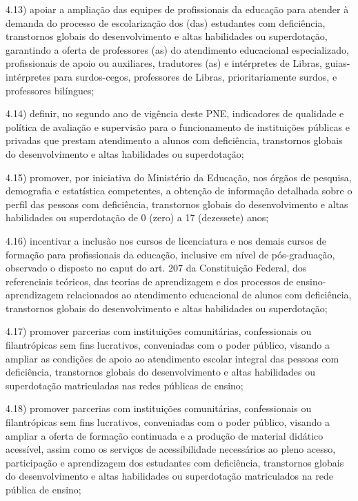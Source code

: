 \documentclass[
]{book}
\begin{document}
4.13) apoiar a ampliação das equipes de profissionais da educação para atender à demanda do processo de escolarização dos (das) estudantes com deficiência, transtornos globais do desenvolvimento e altas habilidades ou superdotação, garantindo a oferta de professores (as) do atendimento educacional especializado, profissionais de apoio ou auxiliares, tradutores (as) e intérpretes de Libras, guias-intérpretes para surdos-cegos, professores de Libras, prioritariamente surdos, e professores bilíngues;

4.14) definir, no segundo ano de vigência deste PNE, indicadores de qualidade e política de avaliação e supervisão para o funcionamento de instituições públicas e privadas que prestam atendimento a alunos com deficiência, transtornos globais do desenvolvimento e altas habilidades ou superdotação;

4.15) promover, por iniciativa do Ministério da Educação, nos órgãos de pesquisa, demografia e estatística competentes, a obtenção de informação detalhada sobre o perfil das pessoas com deficiência, transtornos globais do desenvolvimento e altas habilidades ou superdotação de 0 (zero) a 17 (dezessete) anos;

4.16) incentivar a inclusão nos cursos de licenciatura e nos demais cursos de formação para profissionais da educação, inclusive em nível de pós-graduação, observado o disposto no caput do art. 207 da Constituição Federal, dos referenciais teóricos, das teorias de aprendizagem e dos processos de ensino-aprendizagem relacionados ao atendimento educacional de alunos com deficiência, transtornos globais do desenvolvimento e altas habilidades ou superdotação;

4.17) promover parcerias com instituições comunitárias, confessionais ou filantrópicas sem fins lucrativos, conveniadas com o poder público, visando a ampliar as condições de apoio ao atendimento escolar integral das pessoas com deficiência, transtornos globais do desenvolvimento e altas habilidades ou superdotação matriculadas nas redes públicas de ensino;

4.18) promover parcerias com instituições comunitárias, confessionais ou filantrópicas sem fins lucrativos, conveniadas com o poder público, visando a ampliar a oferta de formação continuada e a produção de material didático acessível, assim como os serviços de acessibilidade necessários ao pleno acesso, participação e aprendizagem dos estudantes com deficiência, transtornos globais do desenvolvimento e altas habilidades ou superdotação matriculados na rede pública de ensino;
\end{document}
